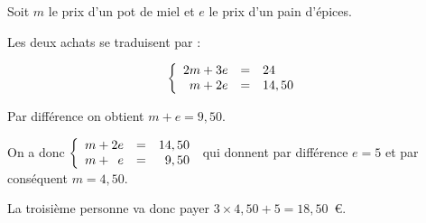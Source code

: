 
\medskip

%
%
%
%
%
Soit $m$ le prix d'un pot de miel et $e$ le prix d'un pain d'épices.

Les deux achats se traduisent par :

\[\left\{\begin{array}{l c l}
2m + 3e&=&24\\
\phantom{2}m + 2e&=&14,50
\end{array}\right.\]

Par différence on obtient $m + e = 9,50$.

On a donc $\left\{\begin{array}{l c r}
m + 2e&=&14,50\\
m + \phantom{2}e &=& 9,50
\end{array}\right.$ qui donnent par différence $e = 5$ et par conséquent $m = 4,50$.

La troisième personne va donc payer $3 \times 4,50 + 5 = 18,50$~\euro.
\vspace{0.5cm}


